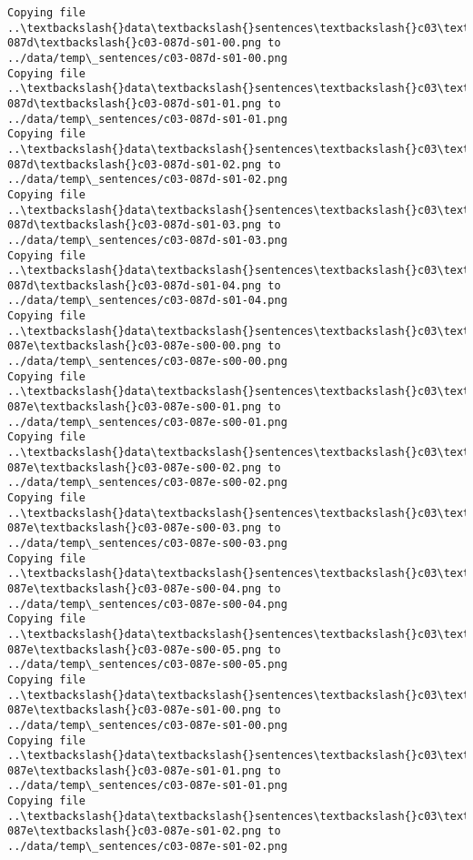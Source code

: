 \documentclass[11pt]{article}
\begin{document}
\begin{Verbatim}[commandchars=\\\{\}]
Copying file ..\textbackslash{}data\textbackslash{}sentences\textbackslash{}c03\textbackslash{}c03-087d\textbackslash{}c03-087d-s01-00.png to
../data/temp\_sentences/c03-087d-s01-00.png
Copying file ..\textbackslash{}data\textbackslash{}sentences\textbackslash{}c03\textbackslash{}c03-087d\textbackslash{}c03-087d-s01-01.png to
../data/temp\_sentences/c03-087d-s01-01.png
Copying file ..\textbackslash{}data\textbackslash{}sentences\textbackslash{}c03\textbackslash{}c03-087d\textbackslash{}c03-087d-s01-02.png to
../data/temp\_sentences/c03-087d-s01-02.png
Copying file ..\textbackslash{}data\textbackslash{}sentences\textbackslash{}c03\textbackslash{}c03-087d\textbackslash{}c03-087d-s01-03.png to
../data/temp\_sentences/c03-087d-s01-03.png
Copying file ..\textbackslash{}data\textbackslash{}sentences\textbackslash{}c03\textbackslash{}c03-087d\textbackslash{}c03-087d-s01-04.png to
../data/temp\_sentences/c03-087d-s01-04.png
Copying file ..\textbackslash{}data\textbackslash{}sentences\textbackslash{}c03\textbackslash{}c03-087e\textbackslash{}c03-087e-s00-00.png to
../data/temp\_sentences/c03-087e-s00-00.png
Copying file ..\textbackslash{}data\textbackslash{}sentences\textbackslash{}c03\textbackslash{}c03-087e\textbackslash{}c03-087e-s00-01.png to
../data/temp\_sentences/c03-087e-s00-01.png
Copying file ..\textbackslash{}data\textbackslash{}sentences\textbackslash{}c03\textbackslash{}c03-087e\textbackslash{}c03-087e-s00-02.png to
../data/temp\_sentences/c03-087e-s00-02.png
Copying file ..\textbackslash{}data\textbackslash{}sentences\textbackslash{}c03\textbackslash{}c03-087e\textbackslash{}c03-087e-s00-03.png to
../data/temp\_sentences/c03-087e-s00-03.png
Copying file ..\textbackslash{}data\textbackslash{}sentences\textbackslash{}c03\textbackslash{}c03-087e\textbackslash{}c03-087e-s00-04.png to
../data/temp\_sentences/c03-087e-s00-04.png
Copying file ..\textbackslash{}data\textbackslash{}sentences\textbackslash{}c03\textbackslash{}c03-087e\textbackslash{}c03-087e-s00-05.png to
../data/temp\_sentences/c03-087e-s00-05.png
Copying file ..\textbackslash{}data\textbackslash{}sentences\textbackslash{}c03\textbackslash{}c03-087e\textbackslash{}c03-087e-s01-00.png to
../data/temp\_sentences/c03-087e-s01-00.png
Copying file ..\textbackslash{}data\textbackslash{}sentences\textbackslash{}c03\textbackslash{}c03-087e\textbackslash{}c03-087e-s01-01.png to
../data/temp\_sentences/c03-087e-s01-01.png
Copying file ..\textbackslash{}data\textbackslash{}sentences\textbackslash{}c03\textbackslash{}c03-087e\textbackslash{}c03-087e-s01-02.png to
../data/temp\_sentences/c03-087e-s01-02.png

\end{Verbatim}
\end{document}

